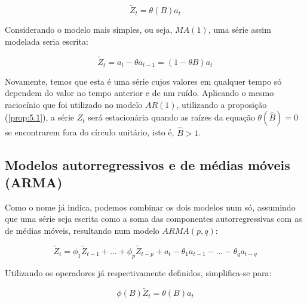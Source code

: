 \begin{equation}\label{series:5.45}
\tilde{Z}_t = \theta(B) a_t 
\end{equation}

Considerando o modelo mais simples, ou seja, $MA(1)$, uma série assim modelada seria escrita:

\[
\tilde{Z}_t = a_t - \theta a_{t-1} = (1 - \theta B)a_t
\]

Novamente, temos que esta é uma série cujos valores em qualquer tempo só dependem do valor no tempo anterior e de um ruído. Aplicando o mesmo raciocínio que foi utilizado no modelo $AR(1)$, utilizando a proposição (\ref{prop:5.1}), a série $Z_t$ será estacionária quando as raízes da equação $\theta(\hat{B}) = 0$ se encontrarem fora do círculo unitário, isto é, $\hat{B} > 1$.


\subsection{Modelos autorregressivos e de médias móveis (ARMA)}

Como o nome já indica, podemos combinar os dois modelos num só, assumindo que uma série seja escrita como a soma das componentes autorregressivas com as de médias móveis, resultando num modelo $ARMA(p, q)$:

\begin{equation}\label{series:5.52}
\tilde{Z}_t = \phi_1 \tilde{Z}_{t-1} + \ldots + \phi_p \tilde{Z}_{t-p} + a_t - \theta_1 a_{t-1} - \ldots - \theta_q a_{t-q}
\end{equation}

Utilizando os operadores já respectivamente definidos, simplifica-se para:

\begin{equation}\label{series:5.53}
\phi(B)\tilde{Z}_t = \theta(B)a_t
\end{equation}













